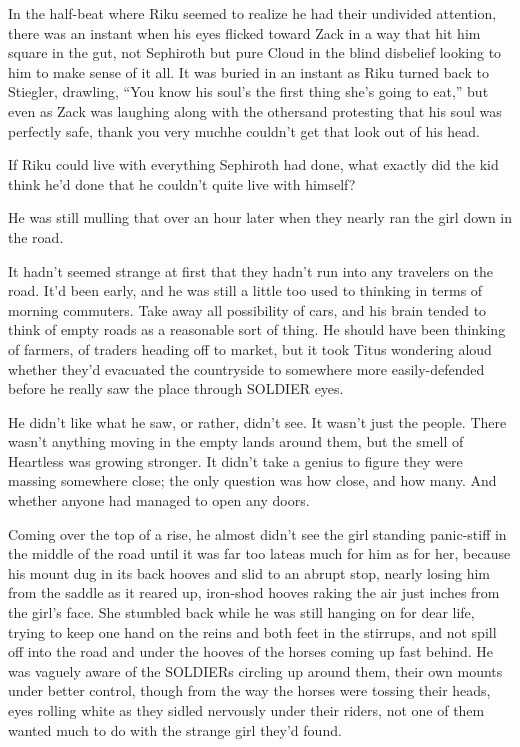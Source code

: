 In the half-beat where Riku seemed to realize he had their undivided attention, there was an instant when his eyes flicked toward Zack in a way that hit him square in the gut, not Sephiroth but pure Cloud in the blind disbelief looking to him to make sense of it all. It was buried in an instant as Riku turned back to Stiegler, drawling, ``You know his soul's the first thing she's going to eat,'' but even as Zack was laughing along with the others\textemdash and protesting that his soul was perfectly safe, thank you very much\textemdash he couldn't get that look out of his head.

If Riku could live with everything Sephiroth had done, what exactly did the kid think he'd done that he couldn't quite live with himself?

He was still mulling that over an hour later when they nearly ran the girl down in the road.


\scenechange


It hadn't seemed strange at first that they hadn't run into any travelers on the road. It'd been early, and he was still a little too used to thinking in terms of morning commuters. Take away all possibility of cars, and his brain tended to think of empty roads as a reasonable sort of thing. He should have been thinking of farmers, of traders heading off to market, but it took Titus wondering aloud whether they'd evacuated the countryside to somewhere more easily-defended before he really saw the place through SOLDIER eyes.

He didn't like what he saw, or rather, didn't see. It wasn't just the people. There wasn't anything moving in the empty lands around them, but the smell of Heartless was growing stronger. It didn't take a genius to figure they were massing somewhere close; the only question was how close, and how many. And whether anyone had managed to open any doors.

Coming over the top of a rise, he almost didn't see the girl standing panic-stiff in the middle of the road until it was far too late\textemdash as much for him as for her, because his mount dug in its back hooves and slid to an abrupt stop, nearly losing him from the saddle as it reared up, iron-shod hooves raking the air just inches from the girl's face. She stumbled back while he was still hanging on for dear life, trying to keep one hand on the reins and both feet in the stirrups, and not spill off into the road and under the hooves of the horses coming up fast behind. He was vaguely aware of the SOLDIERs circling up around them, their own mounts under better control, though from the way the horses were tossing their heads, eyes rolling white as they sidled nervously under their riders, not one of them wanted much to do with the strange girl they'd found.


